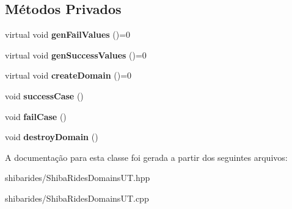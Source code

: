 \subsection*{Métodos Privados}
\begin{DoxyCompactItemize}
\item 
virtual void {\bfseries gen\+Fail\+Values} ()=0\hypertarget{classshibarides_1_1TUDominio_aacb5fcdd84fa980f887769daab4565bc}{}\label{classshibarides_1_1TUDominio_aacb5fcdd84fa980f887769daab4565bc}

\item 
virtual void {\bfseries gen\+Success\+Values} ()=0\hypertarget{classshibarides_1_1TUDominio_a1feb01f87ed74028d29ef2299d4888d9}{}\label{classshibarides_1_1TUDominio_a1feb01f87ed74028d29ef2299d4888d9}

\item 
virtual void {\bfseries create\+Domain} ()=0\hypertarget{classshibarides_1_1TUDominio_af0be8e7153952da7f3abb099fdc404f7}{}\label{classshibarides_1_1TUDominio_af0be8e7153952da7f3abb099fdc404f7}

\item 
void {\bfseries success\+Case} ()\hypertarget{classshibarides_1_1TUDominio_ad4afb45fca447ea713c718fa36d4f5a1}{}\label{classshibarides_1_1TUDominio_ad4afb45fca447ea713c718fa36d4f5a1}

\item 
void {\bfseries fail\+Case} ()\hypertarget{classshibarides_1_1TUDominio_a6a441b2075e00ebf26aa644a76ec793f}{}\label{classshibarides_1_1TUDominio_a6a441b2075e00ebf26aa644a76ec793f}

\item 
void {\bfseries destroy\+Domain} ()\hypertarget{classshibarides_1_1TUDominio_a1a8e0db37850502e9461d252a91d8331}{}\label{classshibarides_1_1TUDominio_a1a8e0db37850502e9461d252a91d8331}

\end{DoxyCompactItemize}


A documentação para esta classe foi gerada a partir dos seguintes arquivos\+:\begin{DoxyCompactItemize}
\item 
shibarides/Shiba\+Rides\+Domains\+U\+T.\+hpp\item 
shibarides/Shiba\+Rides\+Domains\+U\+T.\+cpp\end{DoxyCompactItemize}
